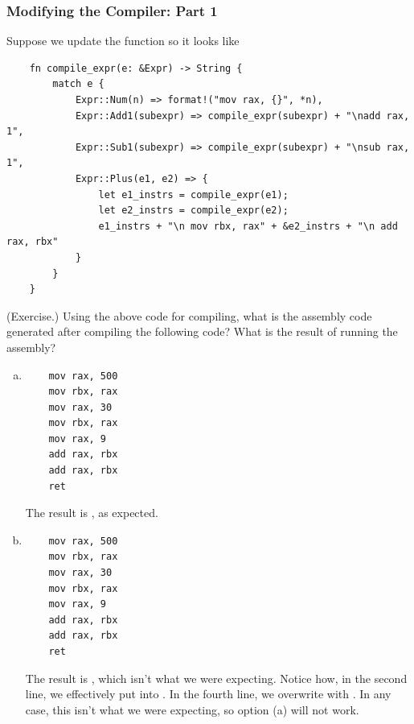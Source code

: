 \documentclass[letterpaper]{article}
\begin{document}
\subsubsection{Modifying the Compiler: Part 1}
Suppose we update the  function so it looks like  
\begin{verbatim}
    fn compile_expr(e: &Expr) -> String {
        match e {
            Expr::Num(n) => format!("mov rax, {}", *n),
            Expr::Add1(subexpr) => compile_expr(subexpr) + "\nadd rax, 1",
            Expr::Sub1(subexpr) => compile_expr(subexpr) + "\nsub rax, 1",
            Expr::Plus(e1, e2) => {
                let e1_instrs = compile_expr(e1);
                let e2_instrs = compile_expr(e2);
                e1_instrs + "\n mov rbx, rax" + &e2_instrs + "\n add rax, rbx"
            }
        }
    }\end{verbatim}

\begin{mdframed}
    (Exercise.) Using the above code for compiling, what is the assembly code generated after compiling the following code? What is the result of running the assembly? 
    \begin{enumerate}[(a)]
        \item {}
        \begin{mdframed}
            \begin{verbatim}
	mov rax, 500
	mov rbx, rax
	mov rax, 30
	mov rbx, rax
	mov rax, 9
	add rax, rbx
	add rax, rbx
	ret\end{verbatim}
            The result is , as expected.
        \end{mdframed}

        \item {}
        \begin{mdframed}
            \begin{verbatim}
	mov rax, 500
	mov rbx, rax
	mov rax, 30
	mov rbx, rax
	mov rax, 9
	add rax, rbx
	add rax, rbx
	ret\end{verbatim}
            The result is , which isn't what we were expecting. Notice how, in the second line, we effectively put  into . In the fourth line, we overwrite  with . In any case, this isn't what we were expecting, so option (a) will not work. 
        \end{mdframed}
    \end{enumerate}
\end{mdframed}
\end{document}

